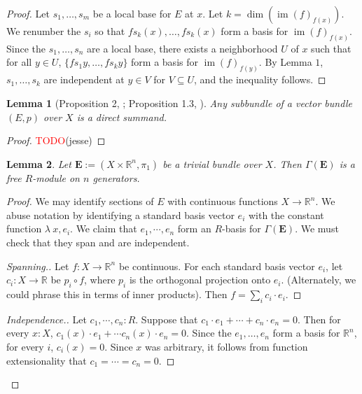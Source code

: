 \documentclass[11pt]{article}
\newcommand{\R}{\mathbb{R}}
\newcommand{\remph}[1]{\textcolor{red}{#1}}
\newcommand{\TODO}{\remph{TODO}}
\newcommand{\im}{\operatorname{im}}
\theoremstyle{plain}
\newtheorem{lemma}{Lemma}[section]
\theoremstyle{definition}
\begin{document}
\begin{proof}
  Let \(s_1, \dots, s_m\) be a local base for \(E\) at \(x\). Let \(k = \dim(\im(f)_{f(x)})\). We renumber the \(s_i\) so that \(fs_k(x), \dots, fs_k(x)\) form a basis for \(\im(f)_{f(x)}\). Since the \(s_1, \dots, s_n\) are a local base, there exists a neighborhood \(U\) of \(x\) such that for all \(y \in U\), \(\{fs_1y, \dots, fs_ky\}\) form a basis for \(\im(f)_{f(y)}\). By Lemma \(1\), \(s_1, \dots, s_k\) are independent at \(y \in V\) for \(V \subseteq U\), and the inequality follows.
\end{proof}


\begin{lemma}[Proposition 2, \cite{swan1962vector}; Proposition 1.3, \cite{hatcher2003vector}] \label{lemma:proposition-2}
  Any subbundle of a vector bundle \((E,p)\) over \(X\) is a direct summand.
\end{lemma}

\begin{proof}
  \TODO(jesse)
\end{proof}

\begin{lemma}\label{lemma:global-sections-trivial-fg}
  Let \(\mathbf{E} := (X \times \R^n, \pi_1)\) be a trivial bundle over \(X\). Then \(\Gamma(\mathbf{E})\) is a free \(R\)-module on \(n\) generators.
\end{lemma}

\begin{proof}
  We may identify sections of \(E\) with continuous functions \(X \to \mathbb{R}^n\). We abuse notation by identifying a standard basis vector \(e_i\) with the constant function \(\lambda\ x, e_i\). We claim that \(e_1, \cdots, e_n\) form an \(R\)-basis for \(\Gamma(\mathbf{E})\). We must check that they span and are independent.
  \begin{proof}[Spanning.]
    Let \(f : X \to \R^n\) be continuous. For each standard basis vector \(e_i\), let \(c_i : X \to \R\) be \(p_i \circ f\), where \(p_i\) is the orthogonal projection onto \(e_i\). (Alternately, we could phrase this in terms of inner products). Then \(f = \sum_i c_i \cdot e_i\).
  \end{proof}

  \begin{proof}[Independence.]
    Let \(c_1, \cdots, c_n : R\). Suppose that \(c_1 \cdot e_1 + \cdots + c_n \cdot e_n = 0\). Then for every \(x : X\), \(c_1(x) \cdot e_1 + \cdots c_n(x) \cdot e_n = 0\). Since the \(e_1, \dots, e_n\) form a basis for \(\R^n\), for every \(i\), \(c_i(x) = 0\). Since \(x\) was arbitrary, it follows from function extensionality that \(c_1 = \cdots = c_n = 0\).
  \end{proof}
\end{proof}
\end{document}
